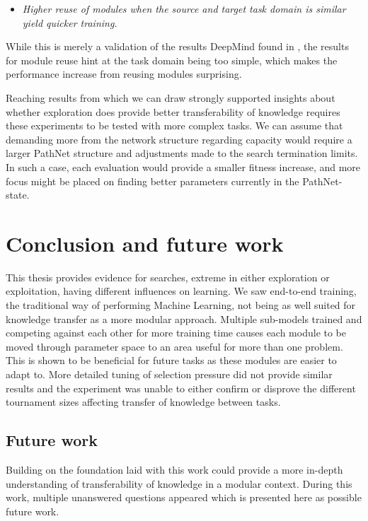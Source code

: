 \begin{itemize}
    \item \emph{Higher reuse of modules when the source and target task domain is similar yield quicker training.}
\end{itemize}
While this is merely a validation of the results DeepMind found in \cite{pathnet}, the results for module reuse hint at the task domain being too simple, which makes the performance increase from reusing modules surprising. 

Reaching results from which we can draw strongly supported insights about whether exploration does provide better transferability of knowledge requires these experiments to be tested with more complex tasks. We can assume that demanding more from the network structure regarding capacity would require a larger PathNet structure and adjustments made to the search termination limits. In such a case, each evaluation would provide a smaller fitness increase, and more focus might be placed on finding better parameters currently in the PathNet-state. 

\section{Conclusion and future work}
This thesis provides evidence for searches, extreme in either exploration or exploitation, having different influences on learning. We saw end-to-end training, the traditional way of performing Machine Learning, not being as well suited for knowledge transfer as a more modular approach. Multiple sub-models trained and competing against each other for more training time causes each module to be moved through parameter space to an area useful for more than one problem. This is shown to be beneficial for future tasks as these modules are easier to adapt to. More detailed tuning of selection pressure did not provide similar results and the experiment was unable to either confirm or disprove the different tournament sizes affecting transfer of knowledge between tasks.

\subsection{Future work}
Building on the foundation laid with this work could provide a more in-depth understanding of transferability of knowledge in a modular context. During this work, multiple unanswered questions appeared which is presented here as possible future work. 

